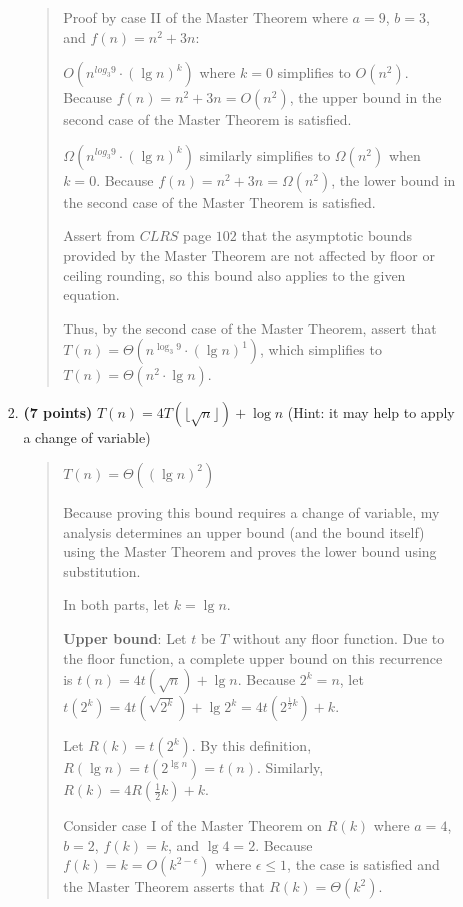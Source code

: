 \documentclass[11pt]{article}
\begin{document}
\begin{enumerate}[leftmargin=*]
\begin{enumerate}
\begin{enumerate}
\begin{quote}
          \medskip
          Proof by case II of the Master Theorem where $a = 9$, $b = 3$, and $f(n) = n^2 + 3n$:

          \medskip
          $O(n^{log_{3}9} \cdot (\lg n)^k)$ where $k = 0$ simplifies to $O(n^2)$. Because $f(n) = n^2 + 3n = O(n^2)$, the upper bound in the second case of the Master Theorem is satisfied.

          \medskip
          $\Omega(n^{log_{3}9} \cdot (\lg n)^k)$ similarly simplifies to $\Omega(n^2)$ when $k = 0$. Because $f(n) = n^2 + 3n = \Omega(n^2)$, the lower bound in the second case of the Master Theorem is satisfied.

          Assert from $CLRS$ page $102$ that the asymptotic bounds provided by the Master Theorem are not affected by floor or ceiling rounding, so this bound also applies to the given equation.

          \medskip
          Thus, by the second case of the Master Theorem, assert that $T(n) = \Theta(n^{\log_{3}9} \cdot (\lg n)^{1})$, which simplifies to $T(n) = \Theta(n^2 \cdot \lg n)$.
        \end{quote}
        \item 
        {\bf (7 points)}
        $T(n) = 4T(\lfloor \sqrt{n} \rfloor) + \log n$ (Hint: it may help to apply a change of variable)
        \begin{quote}
          \color{purple}
          $T(n) = \Theta((\lg n)^2)$

          \medskip
          Because proving this bound requires a change of variable, my analysis determines an upper bound (and the bound itself) using the Master Theorem and proves the lower bound using substitution. 

          \medskip
          In both parts, let $k = \lg n$.
          
          \medskip 
          \textbf{Upper bound}:
          Let $t$ be $T$ without any floor function. Due to the floor function, a complete upper bound on this recurrence is $t(n) = 4t(\sqrt n) + \lg n$. Because $2^k = n$, let $t(2^k) = 4t(\sqrt{2^k}) + \lg{2^k} = 4t(2^{\frac{1}{2}k}) + k$.

          \medskip
           Let $R(k) = t(2^k)$. By this definition, $R(\lg n) = t(2^{\lg n}) = t(n)$. Similarly, $R(k) = 4R(\frac{1}{2}k) + k$.

          \medskip
          Consider case I of the Master Theorem on $R(k)$ where $a = 4$, $b = 2$, $f(k) = k$, and $\lg 4 = 2$. Because $f(k) = k = O(k^{2 - \epsilon})$ where $\epsilon \leq 1$, the case is satisfied and the Master Theorem asserts that $R(k) = \Theta(k^2)$.


\end{quote}
\end{enumerate}
\end{enumerate}
\end{enumerate}
\end{document}
